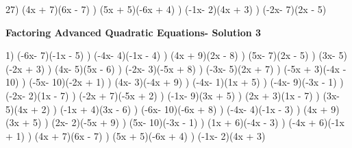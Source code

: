 \documentclass{article}%
\begin{document}
27) (4x + 7)(6x - 7)%
) (5x + 5)(-6x + 4)%
) (-1x- 2)(4x + 3)%
) (-2x- 7)(2x - 5)%
\newline%
\newpage%
\large%
\begin{center}%
\textbf{Factoring Advanced Quadratic Equations- Solution 3}%
\newline%
\end{center} \normalsize%
1) (-6x- 7)(-1x - 5)%
) (-4x- 4)(-1x - 4)%
) (4x + 9)(2x - 8)%
) (5x- 7)(2x - 5)%
) (3x- 5)(-2x + 3)%
) (4x- 5)(5x - 6)%
) (-2x- 3)(-5x + 8)%
) (-3x- 5)(2x + 7)%
) (-5x + 3)(-4x - 10)%
) (-5x- 10)(-2x + 1)%
) (4x- 3)(-4x + 9)%
) (-4x- 1)(1x + 5)%
) (-4x- 9)(-3x - 1)%
) (-2x- 2)(1x - 7)%
) (-2x + 7)(-5x + 2)%
) (-1x- 9)(3x + 5)%
) (2x + 3)(1x - 7)%
) (3x- 5)(4x + 2)%
) (-1x + 4)(3x - 6)%
) (-6x- 10)(-6x + 8)%
) (-4x- 4)(-1x - 3)%
) (4x + 9)(3x + 5)%
) (2x- 2)(-5x + 9)%
) (5x- 10)(-3x - 1)%
) (1x + 6)(-4x - 3)%
) (-4x + 6)(-1x + 1)%
) (4x + 7)(6x - 7)%
) (5x + 5)(-6x + 4)%
) (-1x- 2)(4x + 3)%
\newline%
\end{document}
